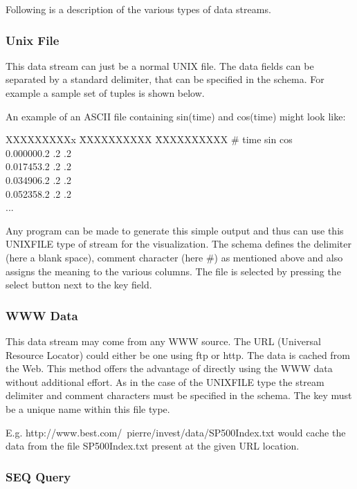 Following is a description of the various types of data streams.

\subsubsection{Unix File}

This  data stream can just be a normal UNIX file. The data fields can be separated by a standard delimiter, that can be specified in the schema. For example a sample set of tuples is shown below.

An example of an ASCII file containing sin(time) and cos(time) might look like:\\ 
\begin{tabbing}
XXXXXXXXXx \= XXXXXXXXXX \= XXXXXXXXXX \kill
\#  time \> sin \> cos \\
0.000000.2 .2 .2 \\
0.017453.2 .2 .2 \\
0.034906.2 .2 .2 \\
0.052358.2 .2 .2 \\
... 
\end{tabbing}

Any program can be made to generate this simple output and thus can use this UNIXFILE type of stream for the visualization. The schema defines the delimiter (here a blank space), comment character (here \#)  as mentioned above and also assigns the meaning to the various columns. The file is selected by pressing the select button next to the key field. 


\subsubsection{WWW Data}

This data stream may come from any WWW source. The URL (Universal Resource Locator) could either be one using ftp or http. The data is cached from the Web. This method offers the advantage of directly using the WWW data without additional effort. As in the case of the UNIXFILE type the stream delimiter and comment characters must be specified in the schema.  The key must be a unique name within this file type.

E.g. http://www.best.com/~pierre/invest/data/SP500Index.txt would cache the data from the file SP500Index.txt present at the given URL location.

\subsubsection{SEQ Query}

